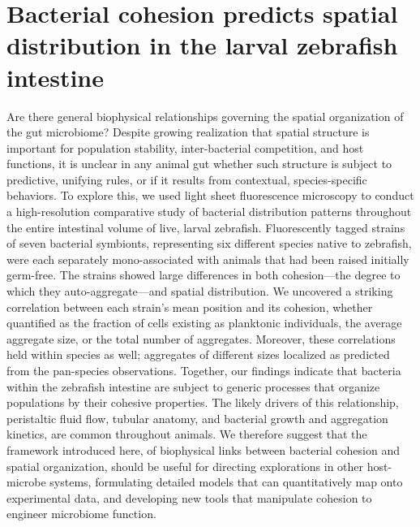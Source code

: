 



\chapter{Bacterial cohesion predicts spatial distribution in the larval zebrafish intestine}






Are there general biophysical relationships governing the spatial organization of the gut microbiome? Despite growing realization that spatial structure is important for population stability, inter-bacterial competition, and host functions, it is unclear in any animal gut whether such structure is subject to predictive, unifying rules, or if it results from contextual, species-specific behaviors. To explore this, we used light sheet fluorescence microscopy to conduct a high-resolution comparative study of bacterial distribution patterns throughout the entire intestinal volume of live, larval zebrafish. Fluorescently tagged strains of seven bacterial symbionts, representing six different species native to zebrafish, were each separately mono-associated with animals that had been raised initially germ-free. The strains showed large differences in both cohesion---the degree to which they auto-aggregate---and spatial distribution. We uncovered a striking correlation between each strain's mean position and its cohesion, whether quantified as the fraction of cells existing as planktonic individuals, the average aggregate size, or the total number of aggregates. Moreover, these correlations held within species as well; aggregates of different sizes localized as predicted from the pan-species observations. Together, our findings indicate that bacteria within the zebrafish intestine are subject to generic processes that organize populations by their cohesive properties. The likely drivers of this relationship, peristaltic fluid flow, tubular anatomy, and bacterial growth and aggregation kinetics, are common throughout animals. We therefore suggest that the framework introduced here, of biophysical links between bacterial cohesion and spatial organization, should be useful for directing explorations in other host-microbe systems, formulating detailed models that can quantitatively map onto experimental data, and developing new tools that manipulate cohesion to engineer microbiome function.

